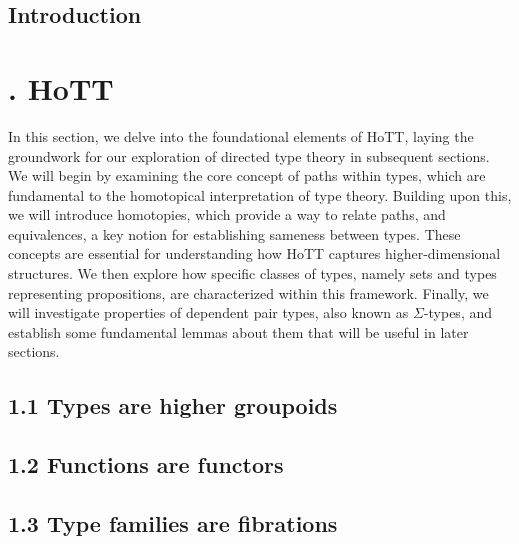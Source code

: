 \documentclass{article}
\theoremstyle{named}
\theoremstyle{remark}
\theoremstyle{definition}
\begin{document}
\newpage 
\subsection*{\centering Introduction}

\newpage
\section*{. HoTT}

In this section, we delve into the foundational elements of HoTT, laying the groundwork for our exploration of directed type theory in subsequent sections. We will begin by examining the core concept of paths within types, which are fundamental to the homotopical interpretation of type theory. Building upon this, we will introduce homotopies, which provide a way to relate paths, and equivalences, a key notion for establishing sameness between types. These concepts are essential for understanding how HoTT captures higher-dimensional structures. We then explore how specific classes of types, namely sets and types representing propositions, are characterized within this framework. Finally, we will investigate properties of dependent pair types, also known as $\Sigma$-types, and establish some fundamental lemmas about them that will be useful in later sections. 

\setcounter{section}{1}

\subsection*{1.1 Types are higher groupoids}


\subsection*{1.2 Functions are functors}


\subsection*{1.3 Type families are fibrations}

\end{document}
